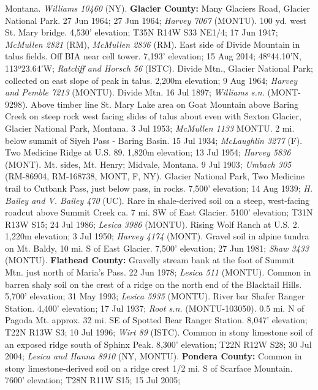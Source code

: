 Montana. \textit{Williams 10460} (NY).
  \textbf{Glacier County:}
Many Glaciers Road, Glacier National Park. 27 Jun 1964; 27 Jun 1964;
\textit{Harvey 7067} (MONTU).
100 yd. west St. Mary bridge. 4,530' elevation; T35N R14W S33 NE1/4;
17 Jun 1947; \textit{McMullen 2821} (RM), \textit{McMullen 2836} (RM).
East side of Divide Mountain in talus fields. Off BIA near cell tower.
7,193' elevation; 15 Aug 2014; 48º44.10'N, 113º23.64'W;
\textit{Ratcliff and Horsch 56} (ISTC).
Divide Mtn., Glacier National Park; collected on east slope of peak in talus.
2,200m elevation; 9 Aug 1964; \textit{Harvey and Pemble 7213} (MONTU).
Divide Mtn. 16 Jul 1897; \textit{Williams s.n.} (MONT-9298).
Above timber line St. Mary Lake area on Goat Mountain above Baring Creek on
steep rock west facing slides of talus about even with Sexton Glacier,
Glacier National Park, Montana. 3 Jul 1953; \textit{McMullen 1133} MONTU.
2 mi. below summit of Siyeh Pass - Baring Basin. 15 Jul 1934;
\textit{McLaughlin 3277} (F).
Two Medicine Ridge at U.S. 89. 1,820m elevation; 13 Jul 1954;
\textit{Harvey 5836} (MONT).
Mt. sides, Mt. Henry; Midvale, Montana. 9 Jul 1903;
\textit{Umbach 305} (RM-86904, RM-168738, MONT, F, NY).
Glacier National Park, Two Medicine trail to Cutbank Pass, just below pass, in
rocks. 7,500' elevation; 14 Aug 1939; \textit{H. Bailey and V. Bailey 470} (UC).
Rare in shale-derived soil on a steep, west-facing roadcut above Summit Creek
ca. 7 mi. SW of East Glacier. 5100' elevation; T31N R13W S15; 24 Jul 1986;
\textit{Lesica 3986} (MONTU).
Rising Wolf Ranch at U.S. 2. 1,220m elevation; 3 Jul 1950;
\textit{Harvey 4174} (MONT).
Gravel soil in alpine tundra on Mt. Baldy, 10 mi. S of East Glacier.
7,500' elevation; 27 Jun 1981; \textit{Shaw 3433} (MONTU).
  \textbf{Flathead County:}
Gravelly stream bank at the foot of Summit Mtn. just north of Maria's Pass.
22 Jun 1978; \textit{Lesica 511} (MONTU).
Common in barren shaly soil on the crest of a ridge on the north end of the
Blacktail Hills. 5,700' elevation; 31 May 1993; \textit{Lesica 5935} (MONTU).
River bar Shafer Ranger Station. 4,400' elevation; 17 Jul 1937;
\textit{Root s.n.} (MONTU-103050).
0.5 mi. N of Pagoda Mt. approx. 32 mi. SE of Spotted Bear Ranger Station.
8,047' elevation; T22N R13W S3; 10 Jul 1996; \textit{Wirt 89} (ISTC).
Common in stony limestone soil of an exposed ridge south of Sphinx Peak.
8,300' elevation; T22N R12W S28; 30 Jul 2004;
\textit{Lesica and Hanna 8910} (NY, MONTU).
  \textbf{Pondera County:}
Common in stony limestone-derived soil on a ridge crest 1/2 mi. S of Scarface
Mountain. 7600' elevation; T28N R11W S15; 15 Jul 2005;
